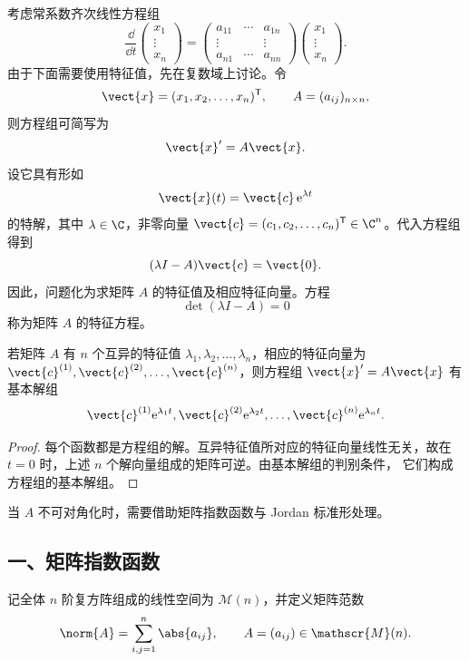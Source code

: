 考虑常系数齐次线性方程组
\[
	\dfrac{\dd}{\dd t}
	\begin{pmatrix}
		x_1\\
		\vdots\\
		x_n
	\end{pmatrix}
	=
	\begin{pmatrix}
		a_{11}&\cdots&a_{1n}\\
		\vdots&&\vdots\\
		a_{n1}&\cdots&a_{nn}
	\end{pmatrix}
	\begin{pmatrix}
		x_1\\
		\vdots\\
		x_n
	\end{pmatrix}.
\]
由于下面需要使用特征值，先在复数域上讨论。令
\[
	\vect{x}=(x_1,x_2,\ldots,x_n)^{\mathsf T},
	\qquad
	A=(a_{ij})_{n\times n},
\]
则方程组可简写为
\[
	\vect{x}'=A\vect{x}.
\]
设它具有形如
\[
	\vect{x}(t)=\vect{c}\,\mathrm{e}^{\lambda t}
\]
的特解，其中 $\lambda\in\C$，非零向量
$\vect{c}=(c_1,c_2,\ldots,c_n)^{\mathsf T}\in\C^n$。代入方程组得到
\[
	(\lambda I-A)\vect{c}=\vect{0}.
\]
因此，问题化为求矩阵 $A$ 的特征值及相应特征向量。方程
\[
	\det(\lambda I-A)=0
\]
称为矩阵 $A$ 的特征方程。

\begin{proposition}\label{thm:互异特征值常系数方程组的基本解组}
	若矩阵 $A$ 有 $n$ 个互异的特征值
	$\lambda_1,\lambda_2,\ldots,\lambda_n$，相应的特征向量为
	$\vect{c}^{(1)},\vect{c}^{(2)},\ldots,\vect{c}^{(n)}$，则方程组
	$\vect{x}'=A\vect{x}$ 有基本解组
	\[
		\vect{c}^{(1)}\mathrm{e}^{\lambda_1t},
		\vect{c}^{(2)}\mathrm{e}^{\lambda_2t},
		\ldots,
		\vect{c}^{(n)}\mathrm{e}^{\lambda_nt}.
	\]
\end{proposition}

\begin{proof}
	每个函数都是方程组的解。互异特征值所对应的特征向量线性无关，故在
	$t=0$ 时，上述 $n$ 个解向量组成的矩阵可逆。由基本解组的判别条件，
	它们构成方程组的基本解组。
\end{proof}

当 $A$ 不可对角化时，需要借助矩阵指数函数与 Jordan 标准形处理。

\subsection*{一、矩阵指数函数}

记全体 $n$ 阶复方阵组成的线性空间为 $\mathscr{M}(n)$，并定义矩阵范数
\[
	\norm{A}=\sum_{i,j=1}^{n}\abs{a_{ij}},
	\qquad A=(a_{ij})\in\mathscr{M}(n).
\]

